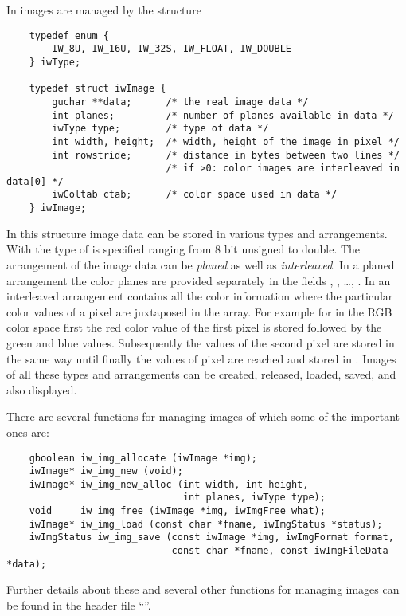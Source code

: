 In \icewing{} images are managed by the structure
\begin{small}
\linespread{0.9}
\begin{verbatim}
    typedef enum {
        IW_8U, IW_16U, IW_32S, IW_FLOAT, IW_DOUBLE
    } iwType;

    typedef struct iwImage {
        guchar **data;      /* the real image data */
        int planes;         /* number of planes available in data */
        iwType type;        /* type of data */
        int width, height;  /* width, height of the image in pixel */
        int rowstride;      /* distance in bytes between two lines */
                            /* if >0: color images are interleaved in data[0] */
        iwColtab ctab;      /* color space used in data */
    } iwImage;
\end{verbatim}
\end{small}
In this structure image data can be stored in various types and
arrangements. With  the type of  is
specified ranging from 8 bit unsigned to double. The arrangement of
the image data can be \emph{planed} as well as
\emph{interleaved}. In a planed arrangement the color planes are
provided separately in the fields , ,
\dots, . In an interleaved arrangement
 contains all the color information where the
particular color values of a pixel are juxtaposed in the array. For
example for  in the RGB color space first the red
color value of the first pixel is stored followed by the green and
blue values. Subsequently the values of the second pixel are stored
in the same way until finally the values of pixel 
are reached and stored in . Images of all these types
and arrangements can be created, released, loaded, saved, and also
displayed.

There are several functions for managing images of which some of the
important ones are:
\begin{small}
\linespread{0.9}
\begin{verbatim}
    gboolean iw_img_allocate (iwImage *img);
    iwImage* iw_img_new (void);
    iwImage* iw_img_new_alloc (int width, int height,
                               int planes, iwType type);
    void     iw_img_free (iwImage *img, iwImgFree what);
    iwImage* iw_img_load (const char *fname, iwImgStatus *status);
    iwImgStatus iw_img_save (const iwImage *img, iwImgFormat format,
                             const char *fname, const iwImgFileData *data);
\end{verbatim}
\end{small}
Further details about these and several other functions for managing
images can be found in the header file ``''.

